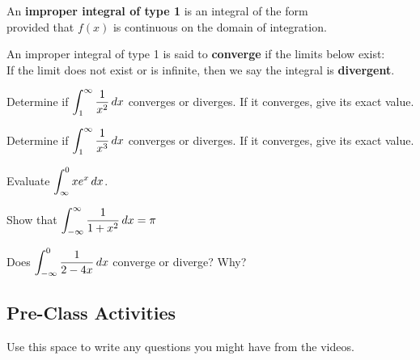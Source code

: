\documentclass[notes]{subfiles}
\begin{document}
		\begin{defn}
			An \textbf{improper integral of type 1} is an integral of the form \\[70pt]
			provided that $f(x)$ is continuous on the domain of integration.
			
		\end{defn}	
		
		\begin{defn}
			An improper integral of type 1 is said to \textbf{converge} if the limits below exist:\\[70pt]
			
			If the limit does not exist or is infinite, then we say the integral is \textbf{divergent}.
		\end{defn}
		
		\begin{ex}
			Determine if $\displaystyle \int_1^\infty \dfrac{1}{x^2}\, dx$ converges or diverges.  If it converges, give its exact value.
		\end{ex}
			
		\begin{ex}
			Determine if $\displaystyle \int_1^\infty \dfrac{1}{x^3}\, dx$ converges or diverges.  If it converges, give its exact value.
		\end{ex}
			\newpage
			
		\begin{ex}
			Evaluate $\displaystyle \int_{\infty}^0 xe^x\, dx$.
		\end{ex}
			
		\begin{ex}
			Show that $\displaystyle \int_{-\infty}^{\infty} \dfrac{1}{1+x^2}\, dx = \pi$
		\end{ex}
			
		\begin{ex}
			Does $\displaystyle \int_{-\infty}^0 \dfrac{1}{2-4x}\, dx$ converge or diverge?  Why?
		\end{ex}
			\newpage
			
		\newpage
	\subsection*{Pre-Class Activities}
		\begin{ex}
			Use this space to write any questions you might have from the videos.
		\end{ex}
			
\end{document}
